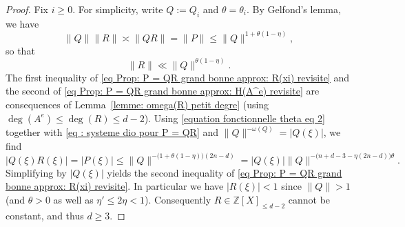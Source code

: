 \documentclass[JEP,XML,SOM,Unicode,NoFloatCountersInSection,published]{cedram}
\newcommand\bZ{\mathbb{Z}}
\newcommand{\normH}[1]{\|#1\|}
\theoremstyle{definition}
\theoremstyle{plain}
\begin{document}
\begin{proof}
Fix $i\geq 0$. For simplicity, write $Q:= Q_i$ and $\theta = \theta_i$. By Gelfond's lemma, we have
\begin{equation*}
\normH{Q}\normH{R}\asymp \normH{QR} = \normH{P} \leq \normH{Q}^{1+\theta(1-\eta)},
\end{equation*}
so that
\begin{equation}
\label{eq proof: H(R) << fonction de H(Q)}
\normH{R}\ll \normH{Q}^{\theta(1-\eta)}.
\end{equation}
The first inequality of \eqref{eq Prop: P = QR grand bonne approx: R(xi) revisite} and the second of \eqref{eq Prop: P = QR grand bonne approx: H(A^e) revisite} are consequences of Lemma~\ref{lemme: omega(R) petit degre} (using $\deg (A^e) \leq \deg(R) \leq d-2$). Using \eqref{equation fonctionnelle theta eq 2} together with \eqref{eq : systeme dio pour P = QR} and $\normH{Q}^{-\omega(Q)} = |Q(\xi)|$, we find
\begin{equation*}
|Q(\xi)R(\xi)| = |P(\xi)| \leq \normH{Q}^{-\big(1+\theta(1-\eta)\big)(2n-d)} = |Q(\xi)|\normH{Q}^{- \big( n+d-3 - \eta(2n-d) \big)\theta}.
\end{equation*}
Simplifying by $|Q(\xi)|$ yields the second inequality of \eqref{eq Prop: P = QR grand bonne approx: R(xi) revisite}. In particular we have $|R(\xi)| < 1$ since $\normH{Q} > 1$ (and $\theta > 0$ as well as $\eta'\leq 2\eta < 1$). Consequently $R\in\bZ[X]_{\leq d-2}$ cannot be constant, and thus $d\geq 3$.


\end{proof}
\end{document}
